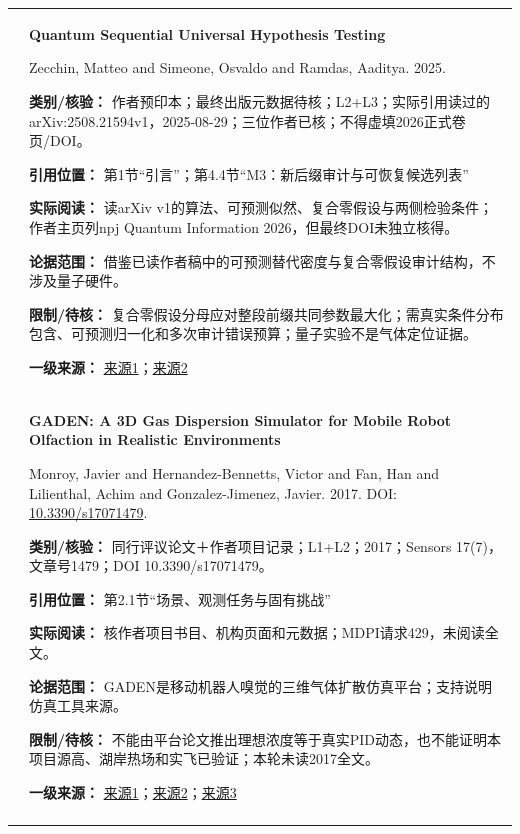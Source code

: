 \begin{longtable}{@{}>{\raggedright\arraybackslash}p{0.7cm}>{\raggedright\arraybackslash}p{14.8cm}@{}}
20 & \textbf{Quantum Sequential Universal Hypothesis Testing}\par Zecchin, Matteo and Simeone, Osvaldo and Ramdas, Aaditya. 2025. \par\textbf{类别/核验：} 作者预印本；最终出版元数据待核；L2+L3；实际引用读过的arXiv:2508.21594v1，2025-08-29；三位作者已核；不得虚填2026正式卷页/DOI。\par\textbf{引用位置：} 第1节“引言”；第4.4节“M3：新后缀审计与可恢复候选列表”\par\textbf{实际阅读：} 读arXiv v1的算法、可预测似然、复合零假设与两侧检验条件；作者主页列npj Quantum Information 2026，但最终DOI未独立核得。\par\textbf{论据范围：} 借鉴已读作者稿中的可预测替代密度与复合零假设审计结构，不涉及量子硬件。\par\textbf{限制/待核：} 复合零假设分母应对整段前缀共同参数最大化；需真实条件分布包含、可预测归一化和多次审计错误预算；量子实验不是气体定位证据。\par\textbf{一级来源：} \href{https://arxiv.org/html/2508.21594v1}{来源1}；\href{https://web.stanford.edu/~aramdas/}{来源2} \\\addlinespace[6pt]
21 & \textbf{GADEN: A 3D Gas Dispersion Simulator for Mobile Robot Olfaction in Realistic Environments}\par Monroy, Javier and Hernandez-Bennetts, Victor and Fan, Han and Lilienthal, Achim and Gonzalez-Jimenez, Javier. 2017. DOI: \url{10.3390/s17071479}. \par\textbf{类别/核验：} 同行评议论文＋作者项目记录；L1+L2；2017；Sensors 17(7)，文章号1479；DOI 10.3390/s17071479。\par\textbf{引用位置：} 第2.1节“场景、观测任务与固有挑战”\par\textbf{实际阅读：} 核作者项目书目、机构页面和元数据；MDPI请求429，未阅读全文。\par\textbf{论据范围：} GADEN是移动机器人嗅觉的三维气体扩散仿真平台；支持说明仿真工具来源。\par\textbf{限制/待核：} 不能由平台论文推出理想浓度等于真实PID动态，也不能证明本项目源高、湖岸热场和实飞已验证；本轮未读2017全文。\par\textbf{一级来源：} \href{https://www.mdpi.com/1424-8220/17/7/1479}{来源1}；\href{https://mapir.isa.uma.es/mapirpubsite/index.php/publications/show/362}{来源2}；\href{https://github.com/MAPIRlab/gaden}{来源3} \\\addlinespace[6pt]

\end{longtable}
